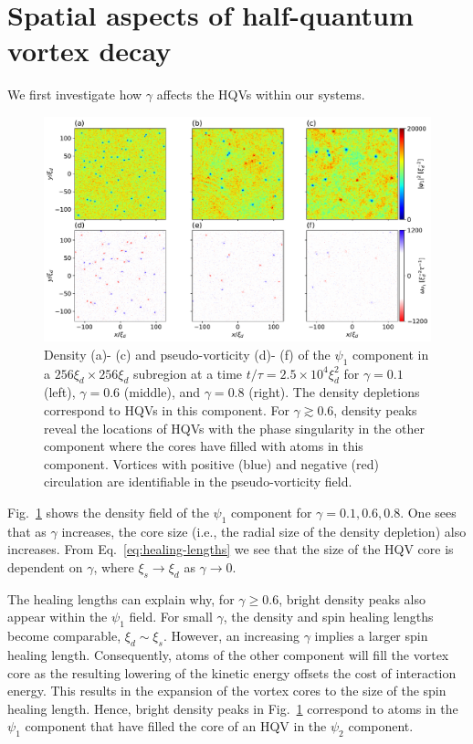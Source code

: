 \section{Spatial aspects of half-quantum vortex decay}
We first investigate how \(\gamma \) affects the HQVs within our systems.
\begin{figure}
    \centering
    \includegraphics[width=\textwidth]{gfx/ch-twoCompDynamics/densVort.pdf}
    \caption[Density and pseudo-vorticity of at late simulation time for various
        \(\gamma \)]
    {\label{fig:density-pseudo-vort}Density (a)- (c) and pseudo-vorticity
        (d)- (f) of the \(\psi_1 \) component in a \(256\xi_d \times 256\xi_d\)
        subregion at a time \(t/\tau=2.5\times 10^4\xi_d^2\) for \(\gamma=0.1\)
        (left), \(\gamma=0.6\) (middle), and \(\gamma=0.8\) (right).
        The density depletions correspond to HQVs in this component.
        For \(\gamma \gtrsim 0.6\), density peaks reveal the locations of HQVs
        with the phase singularity in the other component where the cores have
        filled with atoms in this component.
        Vortices with positive (blue) and negative (red) circulation are
        identifiable in the pseudo-vorticity field.}
\end{figure}
Fig.~\ref{fig:density-pseudo-vort} shows the density field of the \(\psi_1 \)
component for \(\gamma = 0.1, 0.6, 0.8\).
One sees that as \(\gamma \) increases, the core size (i.e., the radial size of
the density depletion) also increases.
From Eq.~\eqref{eq:healing-lengths} we see that the size of the HQV core is
dependent on \(\gamma \), where \(\xi_s \rightarrow \xi_d\) as
\(\gamma \rightarrow 0\).

The healing lengths can explain why, for \(\gamma \geq 0.6\), bright density
peaks also appear within the \(\psi_1 \) field.
For small \(\gamma \), the density and spin healing lengths become comparable,
\(\xi_d \sim \xi_s\).
However, an increasing \(\gamma \) implies a larger spin healing length.
Consequently, atoms of the other component will fill the vortex core as the
resulting lowering of the kinetic energy offsets the cost of interaction energy.
This results in the expansion of the vortex cores to the size of the spin
healing length.
Hence, bright density peaks in Fig.~\ref{fig:density-pseudo-vort} correspond to
atoms in the \(\psi_1 \) component that have filled the core of an HQV in the
\(\psi_2\) component.

